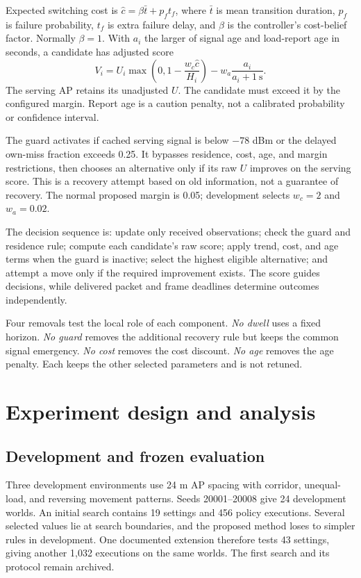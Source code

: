 \documentclass[11pt,a4paper]{article}
\begin{document}
Expected switching cost is $\hat c=\beta\bar t+p_f t_f$, where $\bar t$ is mean transition duration, $p_f$ is failure probability, $t_f$ is extra failure delay, and $\beta$ is the controller's cost-belief factor. Normally $\beta=1$. With $a_i$ the larger of signal age and load-report age in seconds, a candidate has adjusted score
\begin{equation}
 V_i=U_i\max\left(0,1-\frac{w_c\hat c}{H_i}\right)-w_a\frac{a_i}{a_i+1\ \text{s}}.\label{eq:adjusted}
\end{equation}
The serving AP retains its unadjusted $U$. The candidate must exceed it by the configured margin. Report age is a caution penalty, not a calibrated probability or confidence interval.

The guard activates if cached serving signal is below $-78$ dBm or the delayed own-miss fraction exceeds 0.25. It bypasses residence, cost, age, and margin restrictions, then chooses an alternative only if its raw $U$ improves on the serving score. This is a recovery attempt based on old information, not a guarantee of recovery. The normal proposed margin is 0.05; development selects $w_c=2$ and $w_a=0.02$.

The decision sequence is: update only received observations; check the guard and residence rule; compute each candidate's raw score; apply trend, cost, and age terms when the guard is inactive; select the highest eligible alternative; and attempt a move only if the required improvement exists. The score guides decisions, while delivered packet and frame deadlines determine outcomes independently.

Four removals test the local role of each component. \emph{No dwell} uses a fixed horizon. \emph{No guard} removes the additional recovery rule but keeps the common signal emergency. \emph{No cost} removes the cost discount. \emph{No age} removes the age penalty. Each keeps the other selected parameters and is not retuned.

\section{Experiment design and analysis}
\subsection{Development and frozen evaluation}
Three development environments use 24 m AP spacing with corridor, unequal-load, and reversing movement patterns. Seeds 20001--20008 give 24 development worlds. An initial search contains 19 settings and 456 policy executions. Several selected values lie at search boundaries, and the proposed method loses to simpler rules in development. One documented extension therefore tests 43 settings, giving another 1,032 executions on the same worlds. The first search and its protocol remain archived.
\end{document}

